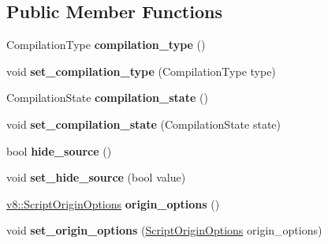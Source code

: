 \subsection*{Public Member Functions}
\begin{DoxyCompactItemize}
\item 
Compilation\+Type {\bfseries compilation\+\_\+type} ()\hypertarget{classv8_1_1internal_1_1_script_a0d24f0841b534b2a65c69afd905606fb}{}\label{classv8_1_1internal_1_1_script_a0d24f0841b534b2a65c69afd905606fb}

\item 
void {\bfseries set\+\_\+compilation\+\_\+type} (Compilation\+Type type)\hypertarget{classv8_1_1internal_1_1_script_ac5c747e61ee61b21cb9b3b41fb8f7e37}{}\label{classv8_1_1internal_1_1_script_ac5c747e61ee61b21cb9b3b41fb8f7e37}

\item 
Compilation\+State {\bfseries compilation\+\_\+state} ()\hypertarget{classv8_1_1internal_1_1_script_a36c45ec6978ec29f14a5f4d5107040a4}{}\label{classv8_1_1internal_1_1_script_a36c45ec6978ec29f14a5f4d5107040a4}

\item 
void {\bfseries set\+\_\+compilation\+\_\+state} (Compilation\+State state)\hypertarget{classv8_1_1internal_1_1_script_ad6da453b2b624bb195815bd5463d8d05}{}\label{classv8_1_1internal_1_1_script_ad6da453b2b624bb195815bd5463d8d05}

\item 
bool {\bfseries hide\+\_\+source} ()\hypertarget{classv8_1_1internal_1_1_script_a142b3e1af2bc63b24c67a2de26d2413b}{}\label{classv8_1_1internal_1_1_script_a142b3e1af2bc63b24c67a2de26d2413b}

\item 
void {\bfseries set\+\_\+hide\+\_\+source} (bool value)\hypertarget{classv8_1_1internal_1_1_script_ad36c2e3caea32789a2b0b62ada4644e6}{}\label{classv8_1_1internal_1_1_script_ad36c2e3caea32789a2b0b62ada4644e6}

\item 
\hyperlink{classv8_1_1_script_origin_options}{v8\+::\+Script\+Origin\+Options} {\bfseries origin\+\_\+options} ()\hypertarget{classv8_1_1internal_1_1_script_ab72ce3771628017bbce7b4a10fcc8cff}{}\label{classv8_1_1internal_1_1_script_ab72ce3771628017bbce7b4a10fcc8cff}

\item 
void {\bfseries set\+\_\+origin\+\_\+options} (\hyperlink{classv8_1_1_script_origin_options}{Script\+Origin\+Options} origin\+\_\+options)\hypertarget{classv8_1_1internal_1_1_script_a241b70909c7ece4d3beafc2a5b0acb1f}{}\label{classv8_1_1internal_1_1_script_a241b70909c7ece4d3beafc2a5b0acb1f}


\end{DoxyCompactItemize}
